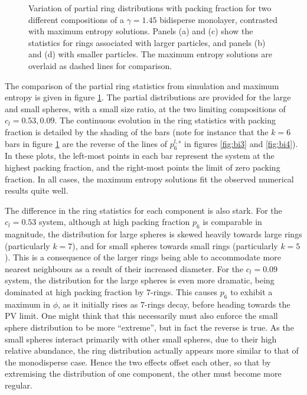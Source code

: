 \begin{figure}[bt]
     \caption{Variation of partial ring distributions with packing fraction for two different compositions of a $\gamma=1.45$ bidisperse monolayer, contrasted with maximum entropy solutions. Panels (a) and (c) show the statistics for rings associated with larger particles, and panels (b) and (d) with smaller particles. The maximum entropy solutions are overlaid as dashed lines for comparison.}
     \label{fig:bime}
\end{figure}

The comparison of the partial ring statistics from simulation and maximum entropy is given in figure \ref{fig:bime}.
The partial distributions are provided for the large and small spheres, with a small size ratio, at the two limiting compositions of $c_l=0.53,0.09$.
The continuous evolution in the ring statistics with packing fraction is detailed by the shading of the bars (note for instance that the $k=6$ bars in figure \ref{fig:bime} are the reverse of the lines of $p_6^{l,s}$ in figures \ref{fig:bi3} and \ref{fig:bi4}).
In these plots, the left\--most points in each bar represent the system at the highest packing fraction, and the right\--most points the limit of zero packing fraction.
In all cases, the maximum entropy solutions fit the observed numerical results quite well.

The difference in the ring statistics for each component is also stark.
For the $c_l=0.53$ system, %
although at high packing fraction $p_6$ is comparable in magnitude, the distribution for large spheres is skewed heavily towards large rings (particularly $k=7$), %
and for small spheres towards small rings (particularly $k=5$).
This is a consequence of the larger rings being able to accommodate more nearest neighbours as a result of their increased diameter.
For the $c_l=0.09$ system, the distribution for the large spheres is even more dramatic, being dominated at high packing fraction by $7$\--rings.
This causes %
$p_6$ to exhibit a maximum in $\phi$, as %
it initially rises as $7$\--rings decay, before heading towards the PV limit.
One might think that this necessarily must also enforce the small sphere distribution to be more ``extreme'', but in fact the reverse is true.
As the small spheres interact primarily with other small spheres, due to their high relative abundance, the ring distribution actually appears more similar to that of the monodisperse case.
Hence%
the two effects offset each other, so that by extremising the distribution of one component, the other must become more regular.


